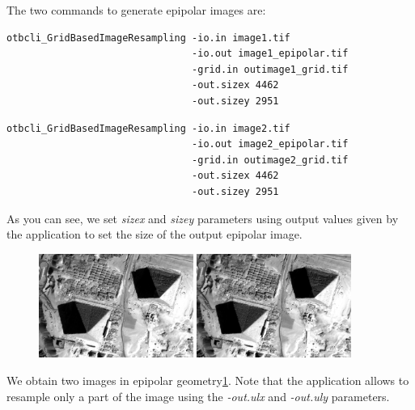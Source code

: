 The two commands to generate epipolar images are:
\begin{verbatim}
otbcli_GridBasedImageResampling -io.in image1.tif
                                -io.out image1_epipolar.tif
                                -grid.in outimage1_grid.tif
                                -out.sizex 4462
                                -out.sizey 2951
\end{verbatim}

\begin{verbatim}
otbcli_GridBasedImageResampling -io.in image2.tif
                                -io.out image2_epipolar.tif
                                -grid.in outimage2_grid.tif
                                -out.sizex 4462
                                -out.sizey 2951
\end{verbatim}

As you can see, we set \textit{sizex} and \textit{sizey} parameters using output values given by
the  application to set the size
of the output epipolar image.

\begin{figure}[!h]
  \center
  \includegraphics[width=0.45\textwidth]{../Art/MonteverdiImages/stereo_image1_epipolar.png}
  \includegraphics[width=0.45\textwidth]{../Art/MonteverdiImages/stereo_image2_epipolar.png}
  \label{fig:EpipolarImages}
\end{figure}

We obtain two images in epipolar geometry\ref{fig:EpipolarImages}. Note that the
application allows to resample only a part of the image using
the \textit{-out.ulx} and \textit{-out.uly} parameters.


